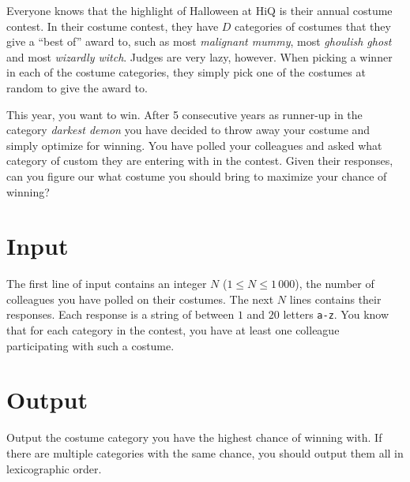 Everyone knows that the highlight of Halloween at HiQ is their annual costume contest.
In their costume contest, they have $D$ categories of costumes that they give a ``best of'' award to, such as most \emph{malignant mummy}, most \emph{ghoulish ghost} and most \emph{wizardly witch}.
Judges are very lazy, however.
When picking a winner in each of the costume categories, they simply pick one of the costumes at random to give the award to.

This year, you want to win.
After 5 consecutive years as runner-up in the category \emph{darkest demon} you have decided to throw away your costume and simply optimize for winning.
You have polled your colleagues and asked what category of custom they are entering with in the contest.
Given their responses, can you figure our what costume you should bring to maximize your chance of winning?

\section*{Input}
The first line of input contains an integer $N$ ($1 \le N \le 1\,000$), the number of colleagues you have polled on their costumes.
The next $N$ lines contains their responses.
Each response is a string of between $1$ and $20$ letters \texttt{a-z}.
You know that for each category in the contest, you have at least one colleague participating with such a costume.

\section*{Output}
Output the costume category you have the highest chance of winning with.
If there are multiple categories with the same chance, you should output them all in lexicographic order.
